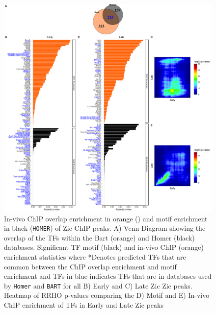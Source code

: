 \documentclass[fleqn,10pt]{wlscirep}
\begin{document}
\begin{figure}[ht]
\centering
\includegraphics[width=.95\textwidth]{../figures/supp_figure2.png}
\caption{In-vivo ChIP overlap enrichment in orange () and motif enrichment in black (\texttt{HOMER}) of Zic ChIP peaks. A) Venn Diagram showing the overlap of the TFs within the Bart (orange) and Homer (black) databases. Significant TF motif (black) and in-vivo ChIP (orange) enrichment statistics where *Denotes predicted TFs that are common between the ChIP overlap enrichment and motif enrichment and TFs in blue indicates TFs that are in databases used by \texttt{Homer} and \texttt{BART} for all B) Early and C) Late Zic Zic peaks. Heatmap of RRHO p-values comparing the D) Motif and E) In-vivo ChIP enrichment of TFs in Early and Late Zic peaks}
\label{fig:HomerBart}
\end{figure}

\end{document}
